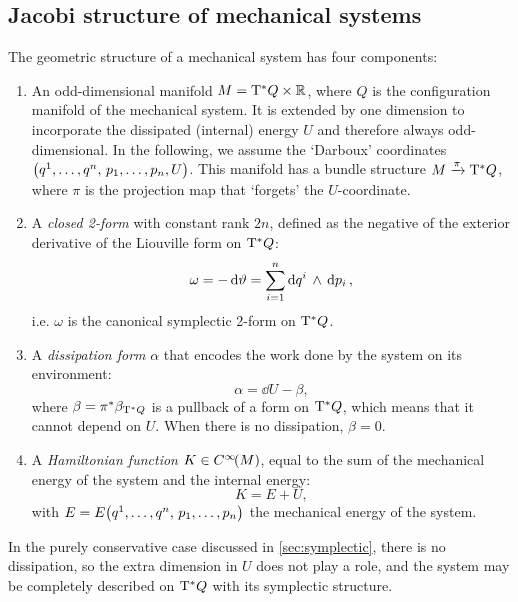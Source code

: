 \subsection{Jacobi structure of mechanical systems}
The geometric structure of a mechanical system has four components:
\begin{enumerate}
    \item An odd-dimensional manifold \(M = \mathrm{T}^*Q\times \mathbb{R}\), where \(Q\) is the configuration manifold of the mechanical system. It is extended by one dimension to incorporate the dissipated (internal) energy \(U\) and therefore always odd-dimensional. In the following, we assume the `Darboux' coordinates \(\qty(q^1, \ldots, q^n,\, p_1, \ldots, p_n, U)\).
    This manifold has a bundle structure \(M\xrightarrow[]{\pi}\mathrm{T}^*Q\), where \(\pi\) is the projection map that `forgets' the \(U\)-coordinate.
    \item A \emph{closed 2-form} with constant rank \(2n\), defined as the negative of the exterior derivative of the Liouville form on \(\mathrm{T}^*Q\):
        \begin{equation}
     \omega = -\dd{\vartheta} = \sum^n_{i=1}  \dd{q^i}\,\wedge\,\dd{p_i} ,
\end{equation}
        i.e. \(\omega\) is the canonical symplectic 2-form on \(\mathrm{T}^*Q\).
    \item A \emph{dissipation form} \(\alpha\) that encodes the work done by the system on its environment:
        \begin{equation}
     \alpha = \dd{U} - \beta,
\end{equation}
        where \(\beta = \pi^*\beta_{\mathrm{T}^*Q}\) is a pullback of a form on \(\mathrm{T}^*Q\), which means that it cannot depend on \(U\). When there is no dissipation, \(\beta = 0\).
    \item A \emph{Hamiltonian function} \(K \in C^\infty\!\qty(M)\), equal to the sum of the mechanical energy of the system and the internal energy:
    \begin{equation}
        K = E + U,
    \end{equation}
    with \(E = E\qty(q^1, \ldots, q^n,\, p_1, \ldots, p_n)\) the mechanical energy of the system.
\end{enumerate}

In the purely conservative case discussed in \cref{sec:symplectic}, there is no dissipation, so the extra dimension in \(U\) does not play a role, and the system may be completely described on \(\mathrm{T}^*Q\) with its symplectic structure. 


